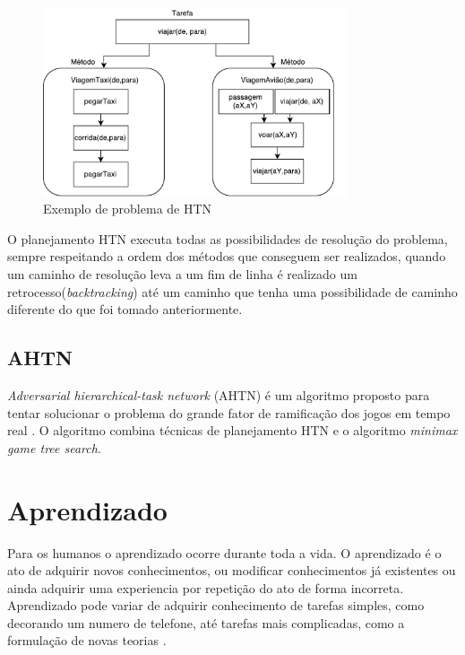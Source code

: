 \begin{figure}[ht]
	\centering
	\includegraphics[width=0.8\textwidth]{fig/travelmethod.pdf}
	\caption{Exemplo de problema de HTN}
	\label{fig:travelmethods}
\end{figure}  

O planejamento HTN executa todas as possibilidades de resolução do problema, sempre respeitando a ordem dos métodos que conseguem ser realizados, quando um caminho de resolução leva a um fim de linha é realizado um retrocesso(\textit{backtracking}) até um caminho que tenha uma possibilidade de caminho diferente do que foi tomado anteriormente.

\subsection{AHTN} 

\textit{Adversarial hierarchical-task network} (AHTN) é um algoritmo proposto para tentar solucionar o problema do grande fator de ramificação dos jogos em tempo real \cite{ontanon2015adversarial}. O algoritmo combina técnicas de planejamento HTN e o algoritmo \textit{minimax game tree search}. \\

\section{Aprendizado} 
Para os humanos o aprendizado ocorre durante toda a vida. O aprendizado é o ato de adquirir novos conhecimentos, ou modificar conhecimentos já existentes ou ainda adquirir uma experiencia por repetição do ato de forma incorreta. Aprendizado pode variar de adquirir conhecimento de tarefas simples, como decorando um numero de telefone, até tarefas mais complicadas, como a formulação de novas teorias \cite{intelligence2003modern}. \\


